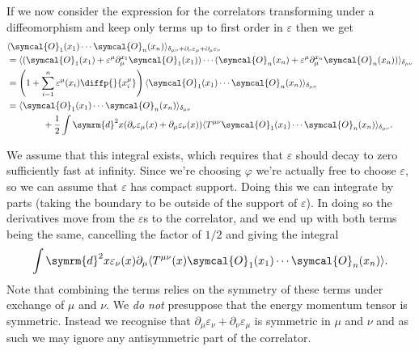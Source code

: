 \documentclass[fleqn]{NotesClass}
\renewcommand{\dl}[1]{\symrm{d}#1}
\newcommand{\quantumField}[1]{\symcal{#1}}
\DeclarePairedDelimiter{\correlator}{\langle}{\rangle}
\begin{document}
    If we now consider the expression for the correlators transforming under a diffeomorphism and keep only terms up to first order in \(\varepsilon\) then we get
    \begin{align}
        \label{eqn:correlator after infinitesimal diffeo}
        &\correlator{\quantumField{O}_1(x_1) \dotsm \quantumField{O}_n(x_n)}_{\delta_{\mu\nu} + \partial_\nu \varepsilon_\mu + \partial_\mu \varepsilon_\nu}\\
        &= \correlator{(\quantumField{O}_1(x_1) + \varepsilon^\mu \partial_\mu^{x_1} \quantumField{O}_1(x_1)) \dotsm (\quantumField{O}_n(x_n) + \varepsilon^\mu \partial_\mu^{x_n} \quantumField{O}_n(x_n))}_{\delta_{\mu\nu}} \notag\\
        &=\left( 1 + \sum_{i=1}^n \varepsilon^\mu(x_i) \diffp{}{x_i^\mu} \right) \correlator{\quantumField{O}_1(x_1) \dotsm \quantumField{O}_n(x_n)}_{\delta_{\mu\nu}} \notag\\
        &= \correlator{\quantumField{O}_1(x_1) \dotsm \quantumField{O}_n(x_n)}_{\delta_{\mu\nu}} \notag\\
        &\qquad\qquad+ \frac{1}{2} \int \dl{^2x} (\partial_\nu \varepsilon_\mu(x) + \partial_\mu \varepsilon_\nu(x)) \correlator{T^{\mu\nu} \quantumField{O}_1(x_1) \dotsm \quantumField{O}_n(x_n)}_{\delta_{\mu\nu}}. \notag 
    \end{align}
    
    We assume that this integral exists, which requires that \(\varepsilon\) should decay to zero sufficiently fast at infinity.
    Since we're choosing \(\varphi\) we're actually free to choose \(\varepsilon\), so we can assume that \(\varepsilon\) has compact support.
    Doing this we can integrate by parts (taking the boundary to be outside of the support of \(\varepsilon\)).
    In doing so the derivatives move from the \(\varepsilon\)s to the correlator, and we end up with both terms being the same, cancelling the factor of \(1/2\) and giving the integral
    \begin{equation}
        \int \dl{^2x} \varepsilon_\nu(x) \partial_\mu \correlator{T^{\mu\nu}(x) \quantumField{O}_1(x_1) \dotsm \quantumField{O}_n(x_n)}.
    \end{equation}
    Note that combining the terms relies on the symmetry of these terms under exchange of \(\mu\) and \(\nu\).
    We \emph{do not} presuppose that the energy momentum tensor is symmetric.
    Instead we recognise that \(\partial_\mu \varepsilon_\nu + \partial_\nu \varepsilon_\mu\) is symmetric in \(\mu\) and \(\nu\) and as such we may ignore any antisymmetric part of the correlator.
    
\end{document}

